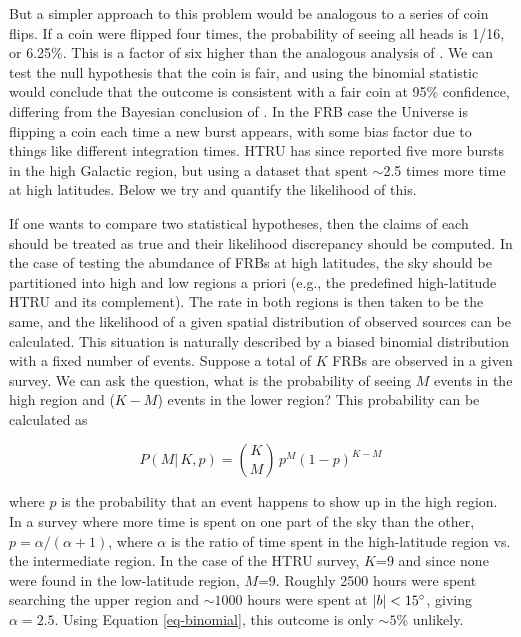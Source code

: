 \documentclass[useAMS,usenatbib]{mn2e}
\begin{document}
But a simpler approach to this problem would be analogous to a series of 
coin flips. If a coin were flipped four times, the probability of seeing all heads is 1/16, 
or 6.25$\%$. This is a factor of six higher than  the analogous analysis of 
\citet{2014ApJ...789L..26P}.  We can test the null hypothesis that the coin is fair, and using
the binomial statistic would conclude that the outcome is consistent with a 
fair coin at 95\% confidence, differing from the Bayesian conclusion of \citet{2014ApJ...789L..26P}.
In the FRB case the Universe is flipping a coin each time a new burst 
appears, with some bias factor due to things like different integration times.
HTRU 
has since reported five more bursts in the high Galactic region, but using a dataset 
that spent $\sim$2.5 times more time at high latitudes. Below we try and quantify the likelihood of 
this.


If one wants to 
compare two statistical hypotheses, then the claims of each should 
be treated as true and their likelihood discrepancy should be computed.
In the case of testing the abundance of FRBs at high latitudes,
the sky should be partitioned into high and low regions a priori 
(e.g., the predefined high-latitude HTRU and its complement). The rate in both regions 
is then taken to be the same, and the likelihood of a given spatial distribution of observed
sources can be calculated. This situation is naturally
described by a biased binomial distribution with a fixed number of events. Suppose
a total of $K$ FRBs are observed in a given survey. We can ask the question, what is the probability of 
seeing $M$ events in the high region and ($K-M$) events in the lower region?
This probability can be calculated %
as 

\begin{equation}
\label{eq-binomial}
P(M | \, {K}, p) =  \binom{K}{M} \, p^{M} (1-p)^{K-M} 
\end{equation}

\noindent where $p$ is the probability that an event happens to show up in the 
high region. In a survey where more time is spent on one part of the 
sky than the other, $p=\alpha/(\alpha+1)$, where $\alpha$ is the ratio of 
time spent in the high-latitude region vs. the intermediate region. In the case of the HTRU 
survey, $K$=9 and since none were found 
in the low-latitude region, $M$=9. Roughly 2500 hours were spent searching the upper region
and $\sim1000$ hours were spent at $|b| < 15\degree$, giving $\alpha=2.5$. Using Equation 
\ref{eq-binomial}, this outcome is only $\sim5\%$ unlikely. 
\end{document}
